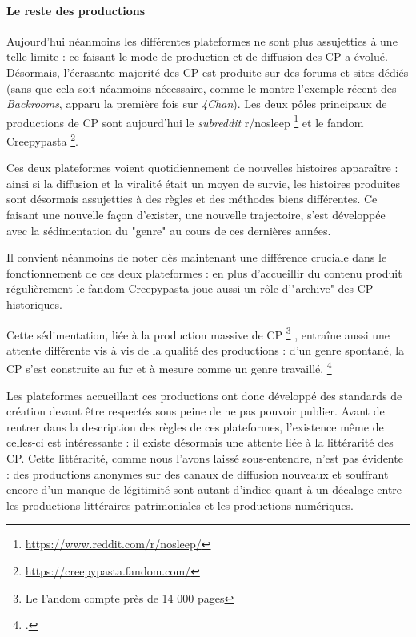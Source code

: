 \documentclass[12pt,a4paper,oneside,titlepage]{article} %
\begin{document}
	\paragraph*{Le reste des productions}
	
	Aujourd’hui néanmoins les différentes plateformes ne sont plus assujetties à une telle limite : ce faisant le mode de production et de diffusion des CP a évolué.
	Désormais, l’écrasante majorité des CP est produite sur des forums et sites dédiés (sans que cela soit néanmoins nécessaire, comme le montre l'exemple récent des \emph{Backrooms}, apparu la première fois sur \emph{4Chan}). Les deux pôles principaux de productions de CP sont aujourd'hui le \emph{subreddit} r/nosleep \footnote{\url{https://www.reddit.com/r/nosleep/}} et le fandom Creepypasta \footnote{\url{https://creepypasta.fandom.com/}}. 
	
	Ces deux plateformes voient  quotidiennement de nouvelles histoires apparaître : ainsi si la diffusion et la viralité était un moyen de survie, les histoires produites sont désormais assujetties à des règles et des méthodes biens différentes. Ce faisant une nouvelle façon d'exister, une nouvelle trajectoire, s'est développée avec la sédimentation du "genre" au cours de ces dernières années. 
	
	Il convient néanmoins de noter dès maintenant une différence cruciale dans le fonctionnement de ces deux plateformes : en plus d'accueillir du contenu produit régulièrement le fandom Creepypasta joue aussi un rôle d'"archive" des CP historiques. 
	
	Cette sédimentation, liée à la production massive de CP \footnote{Le Fandom compte près de 14 000 pages} , entraîne aussi une attente différente vis à vis de la qualité des productions : d'un genre spontané, la CP s'est construite au fur et à mesure comme un genre travaillé. \footcite{garcia_roca_creepypasta_2021}
	
	Les plateformes accueillant ces productions ont donc développé des standards de création devant être respectés sous peine de ne pas pouvoir publier. 
	Avant de rentrer dans la description des règles de ces plateformes, l'existence même de celles-ci est intéressante : il existe désormais une attente liée à la littérarité des CP. Cette littérarité, comme nous l'avons laissé sous-entendre, n'est pas évidente : des productions anonymes sur des canaux de diffusion nouveaux et souffrant encore d'un manque de légitimité sont autant d'indice quant à un décalage entre les productions littéraires patrimoniales et les productions numériques.
	
\end{document}
